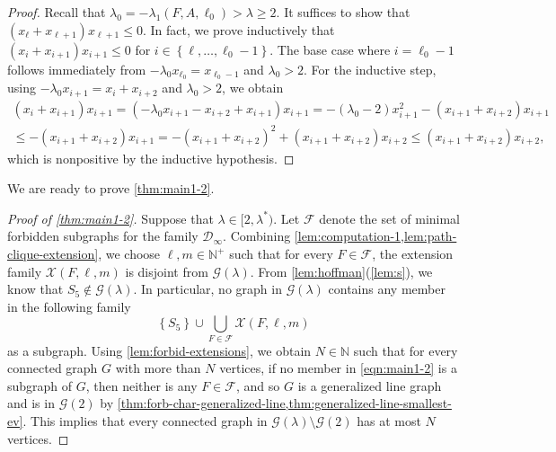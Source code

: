 \documentclass[11pt]{article}
\theoremstyle{definition}
\theoremstyle{remark}
\newcommand{\sset}[1]{\left\{{#1}\right\}}
\newcommand{\la}{\lambda}
\newcommand{\D}{\mathcal{D}}
\newcommand{\F}{\mathcal{F}}
\newcommand{\G}{\mathcal{G}}
\newcommand{\N}{\mathbb{N}}
\newcommand{\X}{\mathcal{X}}
\newcommand{\Gl}{\G(\la)}
\begin{document}
\begin{proof}
    Recall that $\la_0 = -\la_1(F, A, \ell_0) > \la \ge 2$. It suffices to show that $(x_\ell + x_{\ell+1})x_{\ell+1} \le 0$. In fact, we prove inductively that $(x_i + x_{i+1})x_{i+1} \le 0$ for $i \in \sset{\ell, \dots, \ell_0 - 1}$. The base case where $i = \ell_0 - 1$ follows immediately from $-\la_0x_{\ell_0} = x_{\ell_0-1}$ and $\la_0 > 2$. For the inductive step, using $-\la_0x_{i+1} = x_i + x_{i+2}$ and $\la_0 > 2$, we obtain
    \begin{multline*}
        (x_i + x_{i+1})x_{i+1} = (-\la_0x_{i+1} - x_{i+2} + x_{i+1})x_{i+1} = -(\la_0 - 2)x_{i+1}^2 - (x_{i+1}+x_{i+2})x_{i+1} \\
        \le -(x_{i+1}+x_{i+2})x_{i+1} = -(x_{i+1}+x_{i+2})^2 + (x_{i+1}+x_{i+2})x_{i+2} \le (x_{i+1}+x_{i+2})x_{i+2},
    \end{multline*}
    which is nonpositive by the inductive hypothesis.
\end{proof}

We are ready to prove \cref{thm:main1-2}.

\begin{proof}[Proof of \cref{thm:main1-2}]
    Suppose that $\la \in [2, \la^*)$. Let $\F$ denote the set of minimal forbidden subgraphs for the family $\D_\infty$. Combining \cref{lem:computation-1,lem:path-clique-extension}, we choose $\ell, m \in \N^+$ such that for every $F \in \F$, the extension family $\X(F, \ell, m)$ is disjoint from $\Gl$. From \cref{lem:hoffman}(\ref{lem:s}), we know that $S_5 \not\in \Gl$. In particular, no graph in $\Gl$ contains any member in the following family
    \begin{equation} \label{eqn:main1-2}
        \sset{S_5} \cup \bigcup_{F \in \F} \X(F, \ell, m)
    \end{equation}
    as a subgraph. Using \cref{lem:forbid-extensions}, we obtain $N \in \N$ such that for every connected graph $G$ with more than $N$ vertices, if no member in \eqref{eqn:main1-2} is a subgraph of $G$, then neither is any $F \in \F$, and so $G$ is a generalized line graph and is in $\G(2)$ by \cref{thm:forb-char-generalized-line,thm:generalized-line-smallest-ev}. This implies that every connected graph in $\Gl \setminus \G(2)$ has at most $N$ vertices.
\end{proof}
\end{document}
